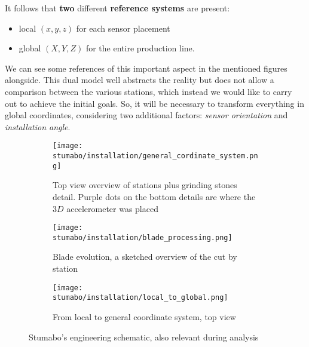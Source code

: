 It follows that \textbf{two} different \textbf{reference systems} are present:
\begin{itemize}\label{item:double_system}
    \item local $(x,y,z)$ for each sensor placement
    \item global $(X,Y,Z)$ for the entire production line.
\end{itemize}
We can see some references of this important aspect in the mentioned figures alongside. %
This dual model well abstracts the reality but does not allow a comparison between the various stations, which instead we would like to carry out to achieve the initial goals.
So, it will be necessary to transform everything in global coordinates, considering two additional factors:
 \textit{sensor orientation} and 
 \textit{installation angle}. 
\begin{figure}[!htp]
    \begin{subfigure}{\textwidth}
        \texttt{[image: stumabo/installation/general\_cordinate\_system.png]}
        \caption{Top view overview of stations plus grinding stones detail.
            Purple dots on the bottom details are where the $3D$ accelerometer was placed}
        \label{fig:top_view_line}
    \end{subfigure}
    \begin{subfigure}{\textwidth}
        \texttt{[image: stumabo/installation/blade\_processing.png]}
        \caption{Blade evolution, a sketched overview of the cut by station}
        \label{fig:blade_evolution}
    \end{subfigure}
    \begin{subfigure}{\textwidth}
        \texttt{[image: stumabo/installation/local\_to\_global.png]}
        \caption{From local to general coordinate system, top view}
        \label{fig:local_to_global}
    \end{subfigure}
    \caption{Stumabo's engineering schematic, also relevant during analysis}
    \label{fig:engineering_files}
\end{figure}

